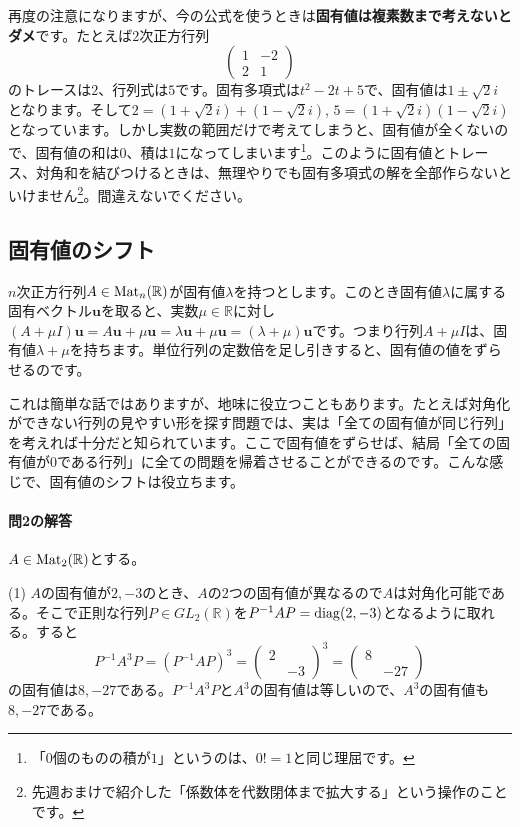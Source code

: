 再度の注意になりますが、今の公式を使うときは\textbf{固有値は複素数まで考えないとダメ}です。たとえば$2$次正方行列
\[
\begin{pmatrix}
1 & -2 \\
2 & 1
\end{pmatrix}
\]
のトレースは$2$、行列式は$5$です。固有多項式は$t^2 - 2t + 5$で、固有値は$1\pm \sqrt{2}i$となります。そして$2 = (1 + \sqrt{2}i) + (1 - \sqrt{2}i)$, $5 = (1 + \sqrt{2}i)(1 - \sqrt{2}i)$となっています。しかし実数の範囲だけで考えてしまうと、固有値が全くないので、固有値の和は$0$、積は$1$になってしまいます\footnote{「$0$個のものの積が$1$」というのは、$0! = 1$と同じ理屈です。}。このように固有値とトレース、対角和を結びつけるときは、無理やりでも固有多項式の解を全部作らないといけません\footnote{先週おまけで紹介した「係数体を代数閉体まで拡大する」という操作のことです。}。間違えないでください。

\subsection{固有値のシフト}

$n$次正方行列$A \in \operatorname{Mat}_n(\mathbb{R})$が固有値$\lambda$を持つとします。このとき固有値$\lambda$に属する固有ベクトル$\bm{u}$を取ると、実数$\mu \in \mathbb{R}$に対し$(A + \mu I)\bm{u} = A\bm{u} + \mu \bm{u} = \lambda \bm{u} + \mu \bm{u} = (\lambda + \mu) \bm{u}$です。つまり行列$A + \mu I$は、固有値$\lambda + \mu$を持ちます。単位行列の定数倍を足し引きすると、固有値の値をずらせるのです。

これは簡単な話ではありますが、地味に役立つこともあります。たとえば対角化ができない行列の見やすい形を探す問題では、実は「全ての固有値が同じ行列」を考えれば十分だと知られています。ここで固有値をずらせば、結局「全ての固有値が$0$である行列」に全ての問題を帰着させることができるのです。こんな感じで、固有値のシフトは役立ちます。

\paragraph{問2の解答} $A \in \operatorname{Mat}_2(\mathbb{R})$とする。

\noindent (1) $A$の固有値が$2, -3$のとき、$A$の$2$つの固有値が異なるので$A$は対角化可能である。そこで正則な行列$P \in GL_2(\mathbb{R})$を$P^{-1} A P = \operatorname{diag}(2, -3)$となるように取れる。すると
\[
P^{-1} A^3 P = (P^{-1} A P)^3 =
\begin{pmatrix}
2 \\
& -3
\end{pmatrix}^3
=
\begin{pmatrix}
8 \\
& -27
\end{pmatrix}
\]
の固有値は$8, -27$である。$P^{-1} A^3 P$と$A^3$の固有値は等しいので、$A^3$の固有値も$8, -27$である。

